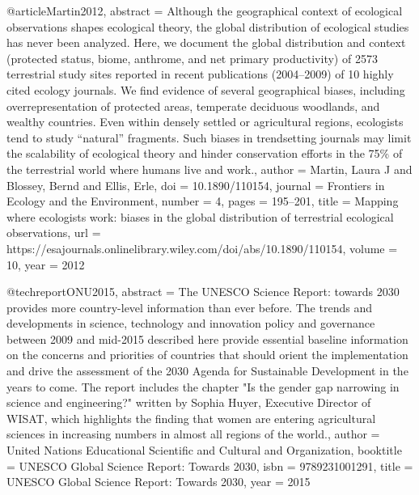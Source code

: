 {{{{{{@article{Martin2012,
abstract = {Although the geographical context of ecological observations shapes ecological theory, the global distribution of ecological studies has never been analyzed. Here, we document the global distribution and context (protected status, biome, anthrome, and net primary productivity) of 2573 terrestrial study sites reported in recent publications (2004–2009) of 10 highly cited ecology journals. We find evidence of several geographical biases, including overrepresentation of protected areas, temperate deciduous woodlands, and wealthy countries. Even within densely settled or agricultural regions, ecologists tend to study “natural” fragments. Such biases in trendsetting journals may limit the scalability of ecological theory and hinder conservation efforts in the 75\% of the terrestrial world where humans live and work.},
author = {Martin, Laura J and Blossey, Bernd and Ellis, Erle},
doi = {10.1890/110154},
journal = {Frontiers in Ecology and the Environment},
number = {4},
pages = {195--201},
title = {{Mapping where ecologists work: biases in the global distribution of terrestrial ecological observations}},
url = {https://esajournals.onlinelibrary.wiley.com/doi/abs/10.1890/110154},
volume = {10},
year = {2012}
}

@techreport{ONU2015,
abstract = {The UNESCO Science Report: towards 2030 provides more country-level information than ever before. The trends and developments in science, technology and innovation policy and governance between 2009 and mid-2015 described here provide essential baseline information on the concerns and priorities of countries that should orient the implementation and drive the assessment of the 2030 Agenda for Sustainable Development in the years to come. The report includes the chapter "Is the gender gap narrowing in science and engineering?" written by Sophia Huyer, Executive Director of WISAT, which highlights the finding that women are entering agricultural sciences in increasing numbers in almost all regions of the world.},
author = {{United Nations Educational Scientific and Cultural} and Organization},
booktitle = {UNESCO Global Science Report: Towards 2030},
isbn = {9789231001291},
title = {{UNESCO Global Science Report: Towards 2030}},
year = {2015}
}

}}}}}}
